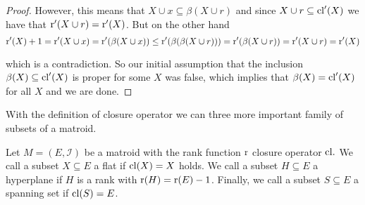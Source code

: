 \begin{proof}
However, this means that $X \cup x \subseteq \beta(X\cup r)$ and since $X\cup r \subseteq \mathrm{cl}'(X)$ we have that $\operatorname{r}'(X\cup r) = 
\operatorname{r}'(X)$. But on the other hand $$\operatorname{r}'(X) + 1= \operatorname{r}'(X\cup x) = \operatorname{r}'(\beta(X\cup x))\leq \operatorname{r}'(\beta(\beta(X\cup r))) = \operatorname{r}'(\beta(X\cup r)) = \operatorname{r}'(X\cup r) = \operatorname{r}'(X)$$

which is a contradiction. So our initial assumption that the inclusion $\beta(X) \subseteq \mathrm{cl}'(X)$ is proper for some $X$ was false, which implies that $\beta(X) = \mathrm{cl}'(X)$ for all $X$ and we are done.




\end{proof}


With the definition of closure operator we can three more important family of subsets of a matroid.

\begin{defn}
    Let $M = (E, \mathcal{I})$ be a matroid with the rank function $\operatorname{r}$ closure operator $\mathrm{cl}.$ We call a subset $X \subseteq E$ a flat if $\mathrm{cl}(X) = X$ holds. We call a subset $H \subseteq E$ a hyperplane if $H$ is a rank with $\operatorname{r}(H) = \operatorname{r}(E)-1$. Finally, we call a subset $S \subseteq E$ a spanning set if $\mathrm{cl}(S) = E$.
\end{defn}

